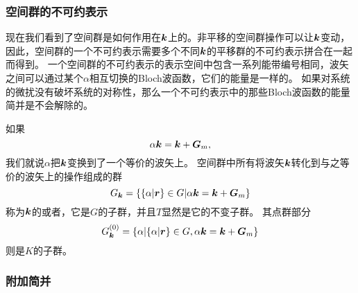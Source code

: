\subsubsection{空间群的不可约表示}

现在我们看到了空间群是如何作用在$\vb*{k}$上的。非平移的空间群操作可以让$\vb*{k}$变动，因此，空间群的一个不可约表示需要多个不同$\vb*{k}$的平移群的不可约表示拼合在一起而得到。
一个空间群的不可约表示的表示空间中包含一系列能带编号相同，波矢之间可以通过某个$\alpha$相互切换的Bloch波函数，它们的能量是一样的。
如果对系统的微扰没有破坏系统的对称性，那么一个不可约表示中的那些Bloch波函数的能量简并是不会解除的。

如果
\begin{equation}
    \alpha \vb*{k} = \vb*{k} + \vb*{G}_m,
\end{equation}
我们就说$\alpha$把$\vb*{k}$变换到了一个等价的波矢上。
空间群中所有将波矢$\vb*{k}$转化到与之等价的波矢上的操作组成的群
\begin{equation}
    G_{\vb*{k}} = \{ \{\alpha | \vb*{r}\} \in G | \alpha \vb*{k} = \vb*{k} + \vb*{G}_m \}
\end{equation}
称为$\vb*{k}$的或者，它是$G$的子群，并且$T$显然是它的不变子群。
其点群部分
\begin{equation}
    G_{\vb*{k}}^{(0)} = \{ \alpha | \{\alpha | \vb*{r}\} \in G,  \alpha \vb*{k} = \vb*{k} + \vb*{G}_m \}
\end{equation}
则是$K$的子群。

\subsubsection{附加简并}

